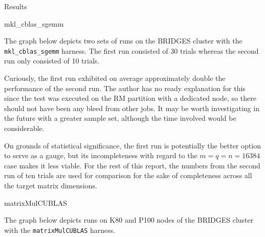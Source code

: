 \documentclass{article}
\begin{document}
\begin{section}{Results}
  \begin{subsection}{mkl\_cblas\_sgemm}
    \begin{paragraph}{}
      The graph below depicts two sets of runs on the BRIDGES cluster with the \texttt{mkl\_cblas\_sgemm} harness.
      The first run consisted of 30 trials whereas the second run only consisted of 10 trials.
    \end{paragraph}
    \begin{paragraph}{}
    \end{paragraph}
    \begin{paragraph}{}
      Curiously, the first run exhibited on average approximately double the performance of the second run. The author has no
      ready explanation for this since the test was executed on the RM partition with a dedicated node, so there should not have
      been any bleed from other jobs. It may be worth investigating in the future with a greater sample set, although the time
      involved would be considerable.
    \end{paragraph}
    \begin{paragraph}{}
      On grounds of statistical significance, the first run is potentially the better option to serve as a gauge, but its incompleteness
      with regard to the $m=q=n=16384$ case makes it less viable. For the rest of this report, the numbers from the second run
      of ten trials are used for comparison for the sake of completeness across all the target matrix dimensions.
    \end{paragraph}
  \end{subsection}
  \begin{subsection}{matrixMulCUBLAS}
    \begin{paragraph}{}
      The graph below depicts runs on K80 and P100 nodes of the BRIDGES cluster with the \texttt{matrixMulCUBLAS} harness.

\end{paragraph}
\end{subsection}
\end{section}
\end{document}
